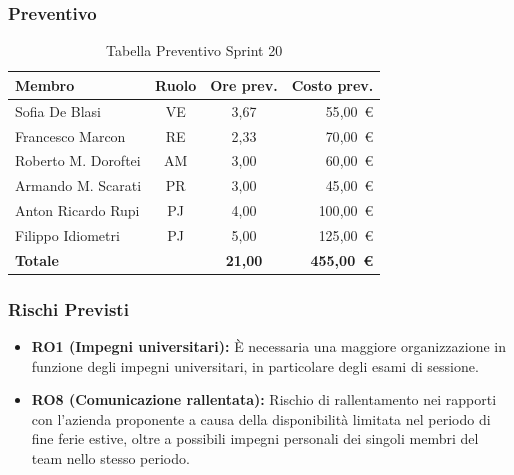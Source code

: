 \subsubsection{Preventivo}
\begin{table}[H]
    \centering
    \renewcommand{\arraystretch}{1.3}
    \begin{tabularx}{\textwidth}{|X|c|c|r|}
        \hline
        \textbf{Membro} & \textbf{Ruolo} & \textbf{Ore prev.} & \textbf{Costo prev.} \\
        \hline
        Sofia De Blasi       & VE & 3,67 &  55{,}00~\euro \\
        Francesco Marcon     & RE & 2,33 &  70{,}00~\euro \\
        Roberto M. Doroftei  & AM & 3,00 &  60{,}00~\euro \\
        Armando M. Scarati   & PR & 3,00 &  45{,}00~\euro \\
        Anton Ricardo Rupi   & PJ & 4,00 & 100{,}00~\euro \\
        Filippo Idiometri    & PJ & 5,00 & 125{,}00~\euro \\
        \hline
        \textbf{Totale}      &    & \textbf{21,00} & \textbf{455{,}00~\euro} \\
        \hline
    \end{tabularx}
    \caption{Tabella Preventivo Sprint 20} 
\end{table}

\subsubsection{Rischi Previsti}
\begin{itemize}
    \item \textbf{RO1 (Impegni universitari):} È necessaria una maggiore organizzazione in funzione degli impegni universitari, in particolare degli esami di sessione.
    \item \textbf{RO8 (Comunicazione rallentata):} Rischio di rallentamento nei rapporti con l'azienda proponente a causa della disponibilità limitata nel periodo di fine ferie estive, oltre a possibili impegni personali dei singoli membri del team nello stesso periodo.
\end{itemize}


